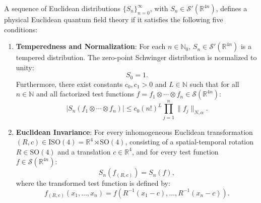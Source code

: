 \begin{axiom}
\label{ax:os_axioms}
A sequence of Euclidean distributions $\{S_n\}_{n=0}^\infty$, with $S_n \in \mathcal{S}'(\mathbb{R}^{4n})$, defines a physical Euclidean quantum field theory if it satisfies the following five conditions:
\begin{enumerate}
    \item[\textbf{OS0}] \textbf{Temperedness and Normalization}: For each $n \in \mathbb{N}_0$, $S_n \in \mathcal{S}'(\mathbb{R}^{4n})$ is a tempered distribution. The zero-point Schwinger distribution is normalized to unity:
    \begin{equation}
    S_0 = 1.
    \end{equation}
    Furthermore, there exist constants $c_0, c_1 > 0$ and $L \in \mathbb{N}$ such that for all $n \in \mathbb{N}$ and all factorized test functions $f = f_1 \otimes \cdots \otimes f_n \in \mathcal{S}(\mathbb{R}^{4n})$:
    \begin{equation}
    \label{eq:os0_linear_growth}
    \left| S_n(f_1 \otimes \cdots \otimes f_n) \right| \le c_0 (n!)^L \prod_{j=1}^n \|f_j\|_{N, \alpha}.
    \end{equation}

    \item[\textbf{OS1}] \textbf{Euclidean Invariance}: For every inhomogeneous Euclidean transformation $(R, c) \in \mathrm{ISO}(4) = \mathbb{R}^4 \rtimes \mathrm{SO}(4)$, consisting of a spatial-temporal rotation $R \in \mathrm{SO}(4)$ and a translation $c \in \mathbb{R}^4$, and for every test function $f \in \mathcal{S}(\mathbb{R}^{4n})$:
    \begin{equation}
    \label{eq:os1_invariance}
    S_n(f_{(R, c)}) = S_n(f),
    \end{equation}
    where the transformed test function is defined by:
    \begin{equation}
    f_{(R, c)}(x_1, \dots, x_n) = f(R^{-1}(x_1 - c), \dots, R^{-1}(x_n - c)).
    \end{equation}


\end{enumerate}
\end{axiom}
